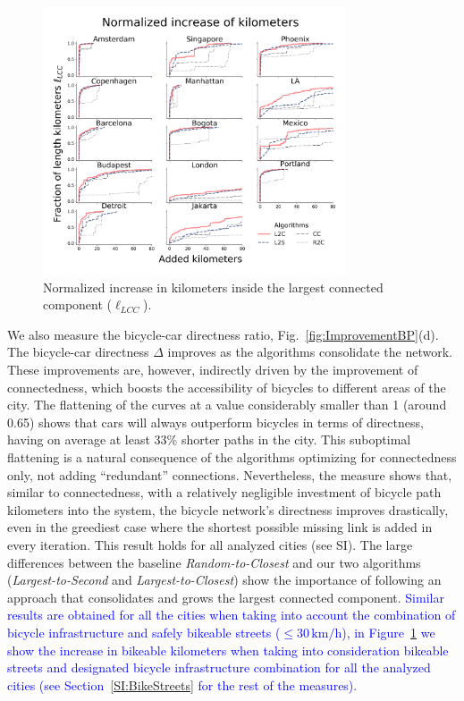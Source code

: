 \begin{figure}[ht!]
  \centering
  \includegraphics[width=0.8\textwidth]{images/datadriven/SI_Lengths_Bike_Streets.png}
  \caption{Normalized increase in kilometers inside the largest connected component ($\ell_{LCC}$).}
  \label{fig:Lengthsncrease_BikeStreets}
\end{figure}

We also measure the bicycle-car directness ratio, Fig.~\ref{fig:ImprovementBP}(d). The bicycle-car directness $\Delta$ improves as the algorithms consolidate the network. These improvements are, however, indirectly driven by the improvement of connectedness, which boosts the accessibility of bicycles to different areas of the city. The flattening of the curves at a value considerably smaller than 1 (around 0.65) shows that cars will always outperform bicycles in terms of directness, having on average at least 33\% shorter paths in the city. This suboptimal flattening is a natural consequence of the algorithms optimizing for connectedness only, not adding ``redundant'' connections. Nevertheless, the measure shows that, similar to connectedness, with a relatively negligible investment of bicycle path kilometers into the system, the bicycle network's directness improves drastically, even in the greediest case where the shortest possible missing link is added in every iteration. This result holds for all analyzed cities (see SI). The large differences between the baseline \emph{Random-to-Closest} and our two algorithms (\emph{Largest-to-Second} and \emph{Largest-to-Closest}) show the importance of following an approach that consolidates and grows the largest connected component. \textcolor{blue}{Similar results are obtained for all the cities when taking into account the combination of bicycle infrastructure and safely bikeable streets ($\leq 30\,\mathrm{km/h}$), in Figure~\ref{fig:Lengthsncrease_BikeStreets} we show the increase in bikeable kilometers when taking into consideration bikeable streets and designated bicycle infrastructure combination for all the analyzed cities (see Section~\ref{SI:BikeStreets} for the rest of the measures).}

